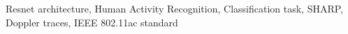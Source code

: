 \documentclass[10pt, conference, letterpaper]{IEEEtran}
\newcommand{\rev}[1]{{\color{blue}#1}}
\newcommand{\red}[1]{{\color{red}#1}}
\begin{document}
\begin{abstract}


\end{abstract}

\IEEEkeywords
Resnet architecture, Human Activity Recognition, Classification task, SHARP, Doppler traces, IEEE 802.11ac standard
\endIEEEkeywords
\end{document}
